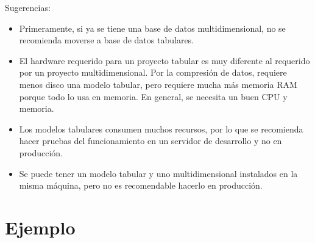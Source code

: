 \documentclass[preprint,12pt]{elsarticle}
\begin{document}
Sugerencias:
\begin{itemize}
	\item Primeramente, si ya se tiene una base de datos multidimensional, no se recomienda moverse a base de datos tabulares.
	\item El hardware requerido para un proyecto tabular es muy diferente al requerido por un proyecto multidimensional. Por la compresión de datos, requiere menos disco una modelo tabular, pero requiere mucha más memoria RAM porque todo lo usa en memoria. En general, se necesita un buen CPU y memoria.
	\item Los modelos tabulares consumen muchos recursos, por lo que se recomienda hacer pruebas del funcionamiento en un servidor de desarrollo y no en producción.
	\item Se puede tener un modelo tabular y uno multidimensional instalados en la misma máquina, pero no es recomendable hacerlo en producción.
\end{itemize}







\section{Ejemplo}
\end{document}
